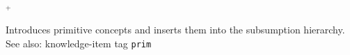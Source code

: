  $^+$

Introduces primitive concepts and inserts them into the subsumption hierarchy.
See also: knowledge-item tag {\tt prim}



